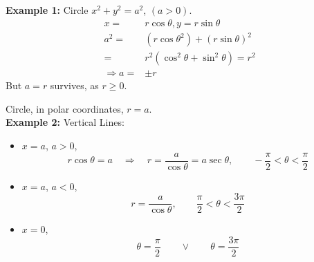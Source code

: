 \documentclass[12pt]{article}
\theoremstyle{plain}
\begin{document}
{\color{Brown}
\textbf{Example 1:} Circle
$x^2 + y^2 = a^2$, $(a>0)$. 
\begin{align*}
	x =& r\cos \theta, y = r\sin\theta\\
%
	a^2 
	=& (r\cos\theta^2) + (r\sin\theta)^2 \\
	=& r^2 (\cos^2\theta+\sin^2\theta) = r^2\\
	\Rightarrow a =& \pm r
\end{align*}
But $a = r$ survives, as $r\geq 0$. 

Circle, in polar coordinates, $r = a$. \\


\textbf{Example 2: }Vertical Lines: 

\begin{itemize}
	\item 	$x = a$, $a > 0$, 
	\[
		r\cos \theta = a 
		\quad \Rightarrow \quad 
		r = \frac a{\cos\theta} = a\sec\theta,
		\qquad -\frac{\pi}2 < \theta < \frac{\pi}2
	\]
	\item $x = a$, $a < 0$, 
		\[
			r = \frac a{\cos\theta}, \qquad \frac{\pi}2 < \theta < \frac{3\pi}2
		\]
	\item $x = 0$, 
		\[
			\theta = \frac{\pi}2 \qquad  \lor \qquad  \theta = \frac{3\pi}2
		\]
\end{itemize}

\newpage
%
%
%
%

}
\end{document}
